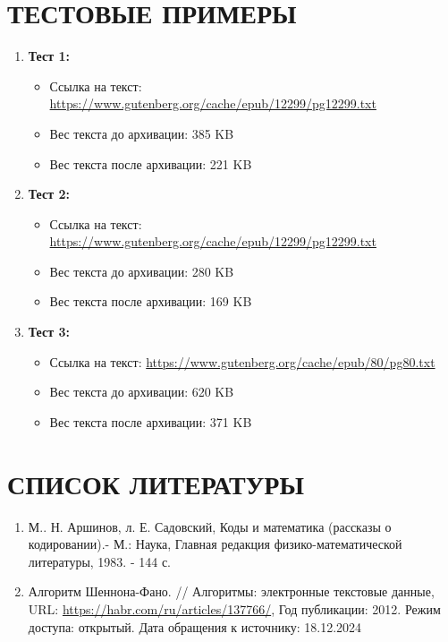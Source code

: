 \documentclass[12pt]{article}
\begin{document}
\section{\textbf{ТЕСТОВЫЕ ПРИМЕРЫ}}
\begin{enumerate}
    \item \textbf{Тест 1:}
    \begin{itemize}
        \item Ссылка на текст: \url{https://www.gutenberg.org/cache/epub/12299/pg12299.txt}
        \item Вес текста до архивации: 385 KB
        \item Вес текста после архивации: 221 KB
    \end{itemize}
    \item \textbf{Тест 2:}
    \begin{itemize}
        \item Ссылка на текст: \url{https://www.gutenberg.org/cache/epub/12299/pg12299.txt}
        \item Вес текста до архивации: 280 KB
        \item Вес текста после архивации: 169 KB
    \end{itemize}
    \item \textbf{Тест 3:}
    \begin{itemize}
        \item Ссылка на текст: \url{https://www.gutenberg.org/cache/epub/80/pg80.txt}
        \item Вес текста до архивации: 620 KB
        \item Вес текста после архивации: 371 KB
    \end{itemize}
\end{enumerate}

\newpage
\section{\textbf{СПИСОК ЛИТЕРАТУРЫ}}
\begin{enumerate}
    \item М.. Н. Аршинов, л. Е. Садовский, Коды и математика (рассказы о кодировании).- М.: Наука, Главная редакция физико-математической литературы, 1983. - 144 с.
    \item Алгоритм Шеннона-Фано. // Алгоритмы: электронные текстовые данные, URL: \url{https://habr.com/ru/articles/137766/}, Год публикации: 2012. Режим доступа: открытый. Дата обращения к источнику: 18.12.2024
\end{enumerate}
\end{document}

